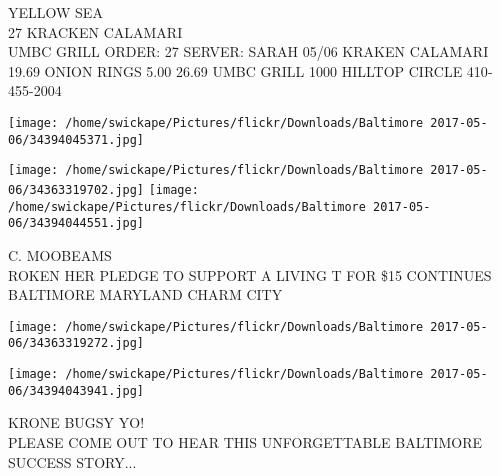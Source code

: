 \documentclass[10pt,letterpaper]{article}
\begin{document}
YELLOW SEA\\
27 KRACKEN CALAMARI\\
UMBC GRILL ORDER: 27 SERVER: SARAH 05/06 KRAKEN CALAMARI 19.69 ONION RINGS 5.00 26.69 UMBC GRILL 1000 HILLTOP CIRCLE 410{-}455{-}2004
\pagebreak

\texttt{[image: /home/swickape/Pictures/flickr/Downloads/Baltimore 2017-05-06/34394045371.jpg]}

\vspace{0.25in}
\texttt{[image: /home/swickape/Pictures/flickr/Downloads/Baltimore 2017-05-06/34363319702.jpg]}
\texttt{[image: /home/swickape/Pictures/flickr/Downloads/Baltimore 2017-05-06/34394044551.jpg]}

C. MOOBEAMS\\
ROKEN HER PLEDGE TO SUPPORT A LIVING T FOR \$15 CONTINUES\\
BALTIMORE MARYLAND CHARM CITY
\pagebreak

\texttt{[image: /home/swickape/Pictures/flickr/Downloads/Baltimore 2017-05-06/34363319272.jpg]}

\vspace{0.25in}
\texttt{[image: /home/swickape/Pictures/flickr/Downloads/Baltimore 2017-05-06/34394043941.jpg]}

KRONE BUGSY YO!\\
PLEASE COME OUT TO HEAR THIS UNFORGETTABLE BALTIMORE SUCCESS STORY...
\pagebreak
\end{document}
